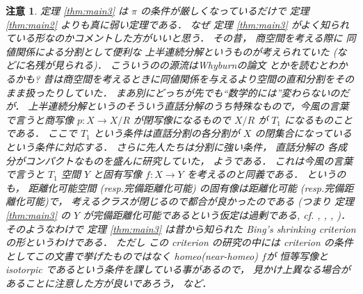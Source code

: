 \documentclass[leqno, a4paper, 12pt]{jsarticle}
\numberwithin{equation}{section}
\newtheorem*{rmk}{注意}
\begin{document}
\begin{rmk}
定理
\ref{thm:main3}
は
$\pi$
の条件が厳しくなっているだけで
定理
\ref{thm:main2}
よりも真に弱い定理である．
なぜ
定理
\ref{thm:main3}
がよく知られている形なのかコメントした方がいいと思う．
その昔，
商空間を考える際に
同値関係による分割として便利な
上半連続分解というものが考えられていた
(\cite{kelly}などに名残が見られる)．
こういうのの源流はWhyburnの論文
\cite{zbMATH02527213}とかを読むとわかるかも?
昔は商空間を考えるときに同値関係を与えるより空間の直和分割をそのまま扱ったりしていた．
まあ別にどっちが先でも``数学的には''変わらないのだが．
上半連続分解というのそういう直話分解のうち特殊なもので，今風の言葉で言うと商写像
$p\colon X\to X/R$
が閉写像になるもので
$X/R$
が
$T_{1}$
になるものことである．
ここで
$T_{1}$
という条件は直話分割の各分割が
$X$
の閉集合になっているという条件に対応する．
さらに先人たちは分割に強い条件，
直話分解の
各成分がコンパクトなものを盛んに研究していた，
ようである．
これは今風の言葉で言うと
$T_{1}$
空間
$Y$
と固有写像
$f\colon X\to Y$
を考えるのと同義である．
というのも，
距離化可能空間
(resp.完備距離化可能)
の固有像は距離化可能
(resp.完備距離化可能)で，
考えるクラスが閉じるので都合が良かったのである
(つまり
定理
\ref{thm:main3}
の
$Y$
が完備距離化可能であるという仮定は過剰である, 
cf. \cite{zbMATH03118918},
\cite{zbMATH03122181},  
\cite[Supplementary results]{zbMATH03511213},
\cite{dempa2})．
そのようなわけで
定理
\ref{thm:main3}
は昔から知られた
Bing's shrinking criterion 
の形というわけである．
ただし
この
criterion
の研究の中には
criterion
の条件としてこの文書で挙げたものではなく
homeo(near-homeo)
$f$が
恒等写像と
isotorpic
であるという条件を課している事があるので，
見かけ上異なる場合があることに注意した方が良いであろう，
\cite{zbMATH03511213}など．
\end{rmk}
\end{document}
